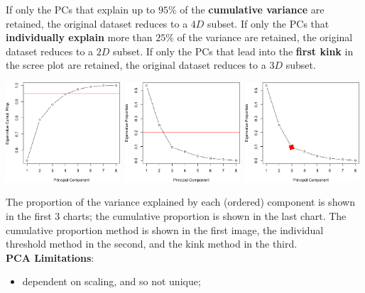 \documentclass[20pt,landscape,footrule,headrule]{foils}
\newcommand{\newl}{\newline\newline}
\begin{document}
{{\begin{center}
\begin{tabular}{ccccccccc}
\end{tabular}
\end{center}
If only the PCs that explain up to $95\%$ of the \textbf{cumulative variance} are retained, the original dataset reduces to a $4D$ subset.
\newl If only the PCs that \textbf{individually explain} more than $25\%$ of the variance are retained, the original dataset reduces to a $2D$ subset.
\newl If only the PCs that lead into the \textbf{first kink} in the scree plot are retained, the original dataset reduces to a $3D$ subset.    \newpage\ \\ \begin{center}
\includegraphics[width=0.32\textwidth]{Images/Eigenvalue_plot4.png}\ 
\includegraphics[width=0.32\textwidth]{Images/Eigenvalue_plot3.png}\ 
\includegraphics[width=0.32\textwidth]{Images/Eigenvalue_plot2.png}
\end{center}
The proportion of the variance explained by each (ordered) component is shown in the first $3$ charts; the cumulative proportion is shown in the last chart. \newl The cumulative proportion method is shown in the first image, the individual threshold method in the second, and the kink method in the third.
\newpage\ \\ \noindent \textbf{PCA Limitations}: \begin{itemize} 
\item dependent on scaling, and so not unique;

\end{itemize}}}
\end{document}
